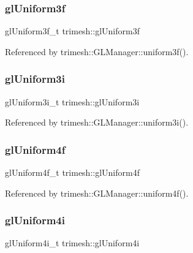 \subsubsection{\texorpdfstring{gl\+Uniform3f}{glUniform3f}}
{\footnotesize\ttfamily gl\+Uniform3f\+\_\+t trimesh\+::gl\+Uniform3f\hspace{0.3cm}{\ttfamily [static]}}



Referenced by trimesh\+::\+G\+L\+Manager\+::uniform3f().

\mbox{\label{namespacetrimesh_af0371770ec12030d984b88a74ab5f7bc}} 
\subsubsection{\texorpdfstring{gl\+Uniform3i}{glUniform3i}}
{\footnotesize\ttfamily gl\+Uniform3i\+\_\+t trimesh\+::gl\+Uniform3i\hspace{0.3cm}{\ttfamily [static]}}



Referenced by trimesh\+::\+G\+L\+Manager\+::uniform3i().

\mbox{\label{namespacetrimesh_a1688c9b902ac92a746cc4644f7f25625}} 
\subsubsection{\texorpdfstring{gl\+Uniform4f}{glUniform4f}}
{\footnotesize\ttfamily gl\+Uniform4f\+\_\+t trimesh\+::gl\+Uniform4f\hspace{0.3cm}{\ttfamily [static]}}



Referenced by trimesh\+::\+G\+L\+Manager\+::uniform4f().

\mbox{\label{namespacetrimesh_abd25cffb3e0b247ec1ebd9c22f096af4}} 
\subsubsection{\texorpdfstring{gl\+Uniform4i}{glUniform4i}}
{\footnotesize\ttfamily gl\+Uniform4i\+\_\+t trimesh\+::gl\+Uniform4i\hspace{0.3cm}{\ttfamily [static]}}



